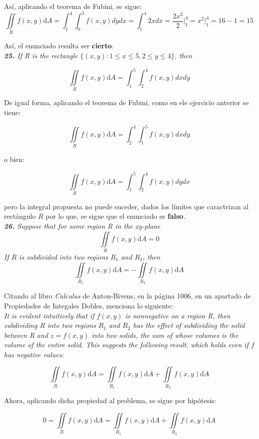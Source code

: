 \documentclass[a4paper,12pt]{article}
\begin{document}
	Así, aplicando el teorema de Fubini, se sigue:
		$$ \iint\limits_{R} f(x,y)\mathrm{d}A = \int_{1}^{4} \int_{0}^{3} f(x,y) dy dx
		 	= \int_{1}^{4} 2x dx = \frac{2x^2}{2} \Big|_1^4 = x^2 \Big|_1^4 = 16 - 1 = 15 $$

		Así, el enunciado resulta ser \textbf{cierto}.\\

	\textit{\textbf{25.} If R is the rectangle $ \{(x,y):1 \leq x \leq 5,2 \leq y \leq 4\} $,
			then}

		$$ \iint\limits_{R} f(x,y)\mathrm{d}A = \int_{1}^{5} \int_{2}^{4} f(x,y) dx dy $$

	De igual forma, aplicando el teorema de Fubini, como en ele ejercicio anterior se tiene:

		$$ \iint\limits_{R} f(x,y)\mathrm{d}A = \int_{2}^{4} \int_{1}^{5} f(x,y) dx dy $$

			o bien:

		$$ \iint\limits_{R} f(x,y)\mathrm{d}A = \int_{1}^{5} \int_{2}^{4} f(x,y) dy dx $$

	pero la integral propuesta no puede suceder, dados los límites que caractrizan
	al rectángulo $R$ por lo que, se sigue que el enunciado es \textbf{falso}.\\

	\textit{\textbf{26.} Suppose that for some region R in the xy-plane}
			$$ \iint\limits_{R} f(x,y)\mathrm{d}A = 0 $$
	\textit{ If $R$ is subdivided into two regions $R_1$ and $R_2$, then }
			$$ \iint\limits_{R_1} f(x,y)\mathrm{d}A = - \iint\limits_{R_2} f(x,y)\mathrm{d}A  $$

	Citando al libro \textit{Calculus} de Anton-Bivens, en la página 1006, en un
	apartado de Propiedades de Integales Dobles, menciona lo siguiente:\\

	\textit{It is evident intuitively that if $f(x, y)$ is nonnegative on a
	region R, then subdividing R into two regions $R_1$ and $R_2$ has the effect
	of subdividing the solid between R and $z = f (x , y)$ into two solids,
	the sum of whose volumes is the volume of the entire solid. This suggests
	the following result, which holds even if $f$ has negative values:}

		$$ \iint\limits_{R} f(x,y)\mathrm{d}A
			= \iint\limits_{R_1} f(x,y)\mathrm{d}A + \iint\limits_{R_2} f(x,y)\mathrm{d}A  $$

	Ahora, aplicando dicha propiedad al problema, se sigue por hipótesis:

		$$ 0 = \iint\limits_{R} f(x,y)\mathrm{d}A
			= \iint\limits_{R_1} f(x,y)\mathrm{d}A + \iint\limits_{R_2} f(x,y)\mathrm{d}A  $$
\end{document}
